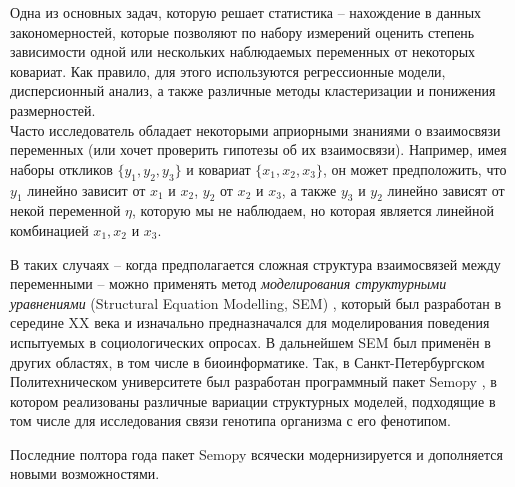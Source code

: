 Одна из основных задач, которую решает статистика -- нахождение в данных закономерностей, которые позволяют по набору измерений оценить степень зависимости одной или нескольких наблюдаемых переменных от некоторых ковариат.
Как правило, для этого используются регрессионные модели, дисперсионный анализ, а также различные методы кластеризации и понижения размерностей. \\

Часто исследователь обладает некоторыми априорными знаниями о взаимосвязи переменных (или хочет проверить гипотезы об их взаимосвязи).
Например, имея наборы откликов $ \{ y_1, y_2, y_3 \} $ и ковариат  $ \{ x_1, x_2, x_3 \} $, он может предположить, что $ y_1 $ линейно зависит от $ x_1  $ и $ x_2 $, $ y_2 $ от $ x_2 $ и $ x_3 $, а также $ y_3 $ и $ y_2 $ линейно зависят от некой переменной $ \eta $, которую мы не наблюдаем, но которая является линейной комбинацией $ x_1, x_2 $ и $ x_3 $.

В таких случаях -- когда предполагается сложная структура взаимосвязей между переменными -- можно применять метод \emph{моделирования структурными уравнениями} (Structural Equation Modelling, SEM) \cite{hoyle2021sem}, который был разработан в середине XX века и изначально предназначался для моделирования поведения испытуемых в социологических опросах.
В дальнейшем SEM был применён в других областях, в том числе в биоинформатике. Так, в Санкт-Петербургском Политехническом университете был разработан программный пакет Semopy \cite{semopy, semopy2}, в котором реализованы различные вариации структурных моделей, подходящие в том числе для исследования связи генотипа организма с его фенотипом.

Последние полтора года пакет Semopy всячески модернизируется и дополняется новыми возможностями.
